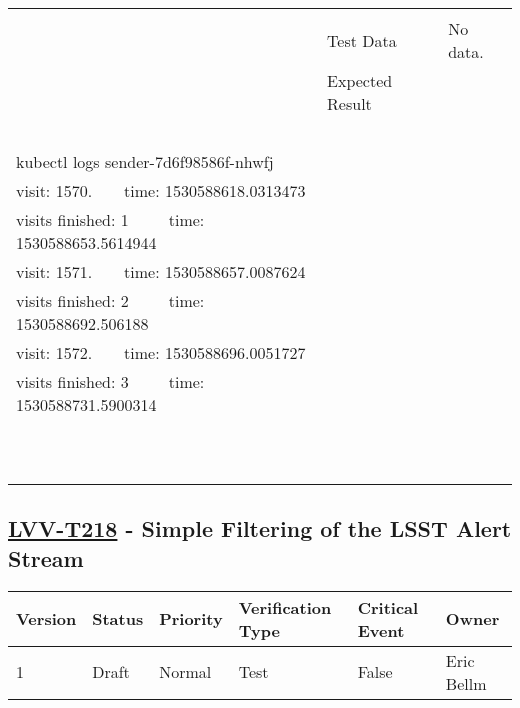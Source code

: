 \begin{longtable}[]{p{1.3cm}p{2cm}p{13cm}}
\begin{minipage}[t]{13cm}
{            \vspace{\dp0}
            } \end{minipage} \\ \cline{2-3}
            & Test Data &
            \begin{minipage}[t]{13cm}{\footnotesize
                No data.
                \vspace{\dp0}
            } \end{minipage} \\ \cline{2-3}
            & Expected Result &
                \begin{minipage}[t]{13cm}{\footnotesize
                Similar to\\
~\\
kubectl logs sender-7d6f98586f-nhwfj\\
visit: 1570. ~ ~ time: 1530588618.0313473\\
visits finished: 1 ~ ~ ~time: 1530588653.5614944\\
visit: 1571. ~ ~ time: 1530588657.0087624\\
visits finished: 2 ~ ~ ~time: 1530588692.506188\\
visit: 1572. ~ ~ time: 1530588696.0051727\\
visits finished: 3 ~ ~ ~time: 1530588731.5900314\\
~\\
~\\

                \vspace{\dp0}
                } \end{minipage}
        \\ \midrule
    \end{longtable}

\subsection{\href{https://jira.lsstcorp.org/secure/Tests.jspa\#/testCase/LVV-T218}{LVV-T218}
    - Simple Filtering of the LSST Alert Stream}\label{lvv-t218}

\begin{longtable}[]{llllll}
\toprule
Version & Status & Priority & Verification Type & Critical Event & Owner
\\\midrule
1 & Draft & Normal &
Test & False & Eric Bellm
\\\bottomrule
\end{longtable}

